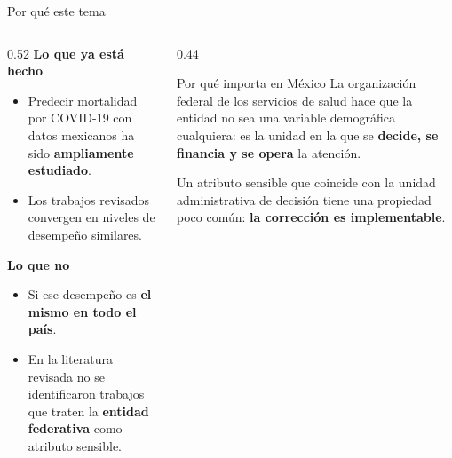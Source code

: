 \documentclass[aspectratio=169,11pt]{beamer}
\newcommand{\resalta}[1]{{\color{vino}\bfseries #1}}
\begin{document}
\begin{frame}{Por qué este tema}
  \vspace{0.3em}
  \begin{columns}[T,onlytextwidth]
    \begin{column}{0.52\textwidth}
      \textbf{Lo que ya está hecho}
      \begin{itemize}
        \item Predecir mortalidad por COVID-19 con datos mexicanos ha sido
              \resalta{ampliamente estudiado}.
        \item Los trabajos revisados convergen en niveles de desempeño
              similares.
      \end{itemize}

      \vspace{0.8em}
      \textbf{Lo que no}
      \begin{itemize}
        \item Si ese desempeño es \resalta{el mismo en todo el país}.
        \item En la literatura revisada no se identificaron trabajos que traten
              la \resalta{entidad federativa} como atributo sensible.
      \end{itemize}
    \end{column}
    \begin{column}{0.44\textwidth}
      \vspace{0.6em}
      \begin{block}{Por qué importa en México}
        La organización federal de los servicios de salud hace que la entidad
        no sea una variable demográfica cualquiera: es la unidad en la que se
        \resalta{decide, se financia y se opera} la atención.

        \vspace{0.5em}
        Un atributo sensible que coincide con la unidad administrativa de
        decisión tiene una propiedad poco común: \resalta{la corrección es
        implementable}.
      \end{block}
    \end{column}
  \end{columns}
\end{frame}
\end{document}
